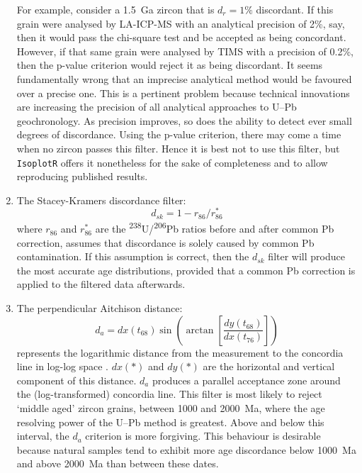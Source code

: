 \begin{refsection}
\begin{enumerate}
    For example, consider a 1.5~Ga zircon that is $d_r=1\%$
    discordant. If this grain were analysed by LA-ICP-MS with an
    analytical precision of 2\%, say, then it would pass the
    chi-square test and be accepted as being concordant. However, if
    that same grain were analysed by TIMS with a precision of 0.2\%,
    then the p-value criterion would reject it as being discordant. It
    seems fundamentally wrong that an imprecise analytical method
    would be favoured over a precise one. This is a pertinent problem
    because technical innovations are increasing the precision of all
    analytical approaches to U--Pb geochronology.  As precision
    improves, so does the ability to detect ever small degrees of
    discordance. Using the p-value criterion, there may come a time
    when no zircon passes this filter.  Hence it is best not to use
    this filter, but \texttt{IsoplotR} offers it nonetheless for the
    sake of completeness and to allow reproducing published results.
  \item The Stacey-Kramers discordance filter:
    \begin{equation}
      d_{sk} = 1 - r_{86}/r_{86}^\ast
    \end{equation}
    \noindent where $r_{86}$ and $r_{86}^\ast$ are the
    \textsuperscript{238}U/\textsuperscript{206}Pb ratios before and
    after common Pb correction, assumes that discordance is solely
    caused by common Pb contamination. If this assumption is correct,
    then the $d_{sk}$ filter will produce the most accurate age
    distributions, provided that a \citet{stacey1975} common Pb
    correction is applied to the filtered data afterwards.
  \item The perpendicular Aitchison distance:
    \begin{equation}
      d_{a} = dx(t_{68}) \sin\!\left(\arctan\!\left[
        \frac{dy(t_{68})}{dx(t_{76})} \right] \right)
    \end{equation}
    \noindent represents the logarithmic distance from the measurement
    to the concordia line in log-log space
    \citep{vermeesch2021}. $dx(\ast)$ and $dy(\ast)$ are the
    horizontal and vertical component of this distance. $d_a$ produces
    a parallel acceptance zone around the (log-transformed) concordia
    line. This filter is most likely to reject `middle aged' zircon
    grains, between 1000 and 2000~Ma, where the age resolving power of
    the U--Pb method is greatest. Above and below this interval, the
    $d_a$ criterion is more forgiving. This behaviour is desirable
    because natural samples tend to exhibit more age discordance below
    1000~Ma and above 2000~Ma than between these dates.


\end{enumerate}
\end{refsection}
